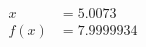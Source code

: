 \documentclass[preview]{standalone}
\begin{document}
\begin{align*}
x &= 5.0073\\f(x) &= 7.9999934
\end{align*}
\end{document}
